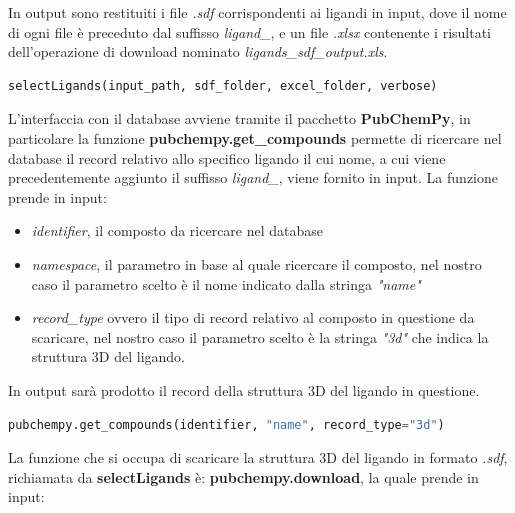 In output sono restituiti i file \textit{.sdf} corrispondenti ai ligandi in input, dove il nome di ogni file è preceduto dal suffisso \textit{ligand\_}, e un file \textit{.xlsx} contenente i risultati dell'operazione di download nominato \textit{ligands\_sdf\_output.xls}.

\begin{lstlisting}[language=Python, label=lst:code4, caption={funzione selectLigands}]
selectLigands(input_path, sdf_folder, excel_folder, verbose)
\end{lstlisting}

L'interfaccia con il database avviene tramite il pacchetto \textbf{PubChemPy}, in particolare la funzione \textbf{pubchempy.get\_compounds} permette di ricercare nel database il record relativo allo specifico ligando il cui nome, a cui viene precedentemente aggiunto il suffisso \textit{ligand\_}, viene fornito in input. La funzione prende in input:

\begin{itemize}
    \item \textit{identifier}, il composto da ricercare nel database
    \item \textit{namespace}, il parametro in base al quale ricercare il composto, nel nostro caso il parametro scelto è il nome indicato dalla stringa \textit{"name"}
    \item \textit{record\_type} ovvero il tipo di record relativo al composto in questione da scaricare, 
    nel nostro caso il parametro scelto è la stringa \textit{"3d"} che indica la struttura 3D del ligando.
\end{itemize}

In output sarà prodotto il record della struttura 3D del ligando in questione.

\begin{lstlisting}[language=Python, label=lst:code5, caption={funzione pubchempy.get\_compounds}]
pubchempy.get_compounds(identifier, "name", record_type="3d")
\end{lstlisting}

La funzione che si occupa di scaricare la struttura 3D del ligando in formato \textit{.sdf}, richiamata da \textbf{selectLigands} è: \textbf{pubchempy.download}, la quale prende in input:

